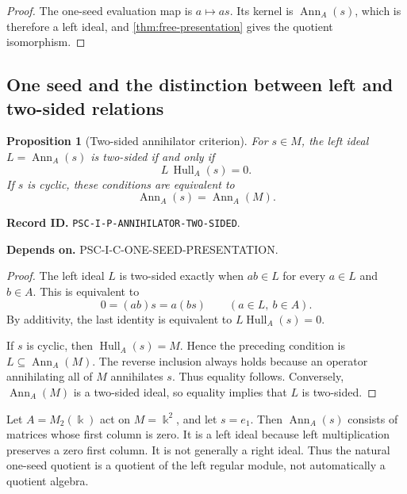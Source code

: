 \documentclass[11pt]{article}
\newtheorem{proposition}[proposition]{Proposition}
\theoremstyle{definition}
\theoremstyle{remark}
\newcommand{\bbk}{\Bbbk}
\newcommand{\Hull}{\operatorname{Hull}}
\newcommand{\RecordID}[1]{\par\smallskip\noindent\begingroup\footnotesize\color{PSCGray}\raggedright\textbf{Record ID.} \nolinkurl{#1}.\par\endgroup}
\newcommand{\Depends}[1]{\par\noindent\begingroup\footnotesize\color{PSCGray}\raggedright\textbf{Depends on.} #1\par\endgroup}
\begin{document}
\begin{proof}
The one-seed evaluation map is $a\mapsto as$.  Its kernel is $\operatorname{Ann}_A(s)$, which is therefore a left ideal, and \cref{thm:free-presentation} gives the quotient isomorphism.
\end{proof}

\subsection{One seed and the distinction between left and two-sided relations}
\begin{proposition}[Two-sided annihilator criterion]
\label{prop:two-sided-annihilator}
For $s\in M$, the left ideal $L=\operatorname{Ann}_A(s)$ is two-sided if and only if
\[
L\,\Hull_A(s)=0.
\]
If $s$ is cyclic, these conditions are equivalent to
\[
\operatorname{Ann}_A(s)=\operatorname{Ann}_A(M).
\]
\end{proposition}
\RecordID{PSC-I-P-ANNIHILATOR-TWO-SIDED}
\Depends{PSC-I-C-ONE-SEED-PRESENTATION.}

\begin{proof}
The left ideal $L$ is two-sided exactly when $ab\in L$ for every $a\in L$ and $b\in A$.  This is equivalent to
\[
0=(ab)s=a(bs)
\qquad(a\in L,\ b\in A).
\]
By additivity, the last identity is equivalent to $L\Hull_A(s)=0$.

If $s$ is cyclic, then $\Hull_A(s)=M$.  Hence the preceding condition is $L\subseteq\operatorname{Ann}_A(M)$.  The reverse inclusion always holds because an operator annihilating all of $M$ annihilates $s$.  Thus equality follows.  Conversely, $\operatorname{Ann}_A(M)$ is a two-sided ideal, so equality implies that $L$ is two-sided.
\end{proof}

\begin{microexample}[title={Why the annihilator need not be two-sided}]
Let \(A=M_2(\bbk)\) act on \(M=\bbk^2\), and let \(s=e_1\).  Then \(\operatorname{Ann}_A(s)\) consists of matrices whose first column is zero.  It is a left ideal because left multiplication preserves a zero first column.  It is not generally a right ideal.  Thus the natural one-seed quotient is a quotient of the left regular module, not automatically a quotient algebra.
\end{microexample}
\end{document}

